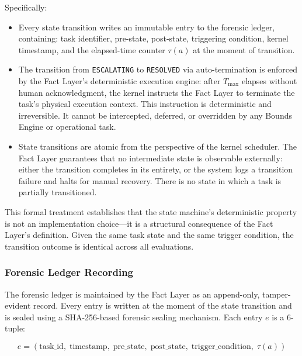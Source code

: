 Specifically:

\begin{itemize}
\item Every state transition writes an immutable entry to the forensic ledger, containing: task identifier, pre-state, post-state, triggering condition, kernel timestamp, and the elapsed-time counter $\tau(a)$ at the moment of transition.

\item The transition from \texttt{ESCALATING} to \texttt{RESOLVED} via auto-termination is enforced by the Fact Layer's deterministic execution engine: after $T_{\text{max}}$ elapses without human acknowledgment, the kernel instructs the Fact Layer to terminate the task's physical execution context. This instruction is deterministic and irreversible. It cannot be intercepted, deferred, or overridden by any Bounds Engine or operational task.

\item State transitions are atomic from the perspective of the kernel scheduler. The Fact Layer guarantees that no intermediate state is observable externally: either the transition completes in its entirety, or the system logs a transition failure and halts for manual recovery. There is no state in which a task is partially transitioned.
\end{itemize}

This formal treatment establishes that the state machine's deterministic property is not an implementation choice---it is a structural consequence of the Fact Layer's definition. Given the same task state and the same trigger condition, the transition outcome is identical across all evaluations.

\subsubsection{Forensic Ledger Recording}
\label{sec:forensic-recording}

The forensic ledger is maintained by the Fact Layer as an append-only, tamper-evident record. Every entry is written at the moment of the state transition and is sealed using a SHA-256-based forensic sealing mechanism. Each entry $e$ is a 6-tuple:

\begin{equation}
e = (\text{task\_id}, \; \text{timestamp}, \; \text{pre\_state}, \; \text{post\_state}, \; \text{trigger\_condition}, \; \tau(a))
\tag{L-edger-entry}
\end{equation}

